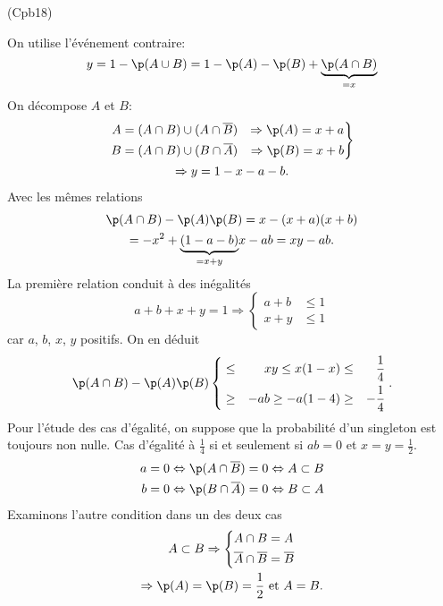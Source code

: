 \begin{tiny}(Cpb18)\end{tiny} On utilise l'événement contraire:
\[
  y = 1 - \p(A \cup B)
  = 1 -\p(A) - \p(B) + \underset{=x}{\underbrace{\p(A\cap B)}}
\]
On décompose $A$ et $B$:
\begin{multline*}
\left.
  \begin{aligned}
    A &= (A\cap B) \cup (A \cap \overline{B}) &\Rightarrow \p(A) = x + a\\
    B &= (A\cap B) \cup (B \cap \overline{A}) &\Rightarrow \p(B) = x + b
  \end{aligned}
\right\rbrace \\ \Rightarrow
y = 1 - x -a -b.
\end{multline*}
Avec les mêmes relations
\begin{multline*}
  \p(A \cap B) -\p(A) \p(B)
  = x -(x+a)(x+b) \\
  = -x^2 + \underset{=x+y}{\underbrace{(1-a-b)}} x -ab
  = xy - ab.
\end{multline*}
La première relation conduit à des inégalités
\[
  a + b + x + y = 1
  \Rightarrow
  \left\lbrace
  \begin{aligned}
    a + b &\leq 1 \\ x + y &\leq 1
  \end{aligned}
  \right.
\]
car $a$, $b$, $x$, $y$ positifs. On en déduit
\[
\p(A \cap B) -\p(A) \p(B)
\left\lbrace
\begin{aligned}
   &\leq& xy  \leq x(1-x)  &\leq& \frac{1}{4} \\
   &\geq& -ab \geq -a(1-4) &\geq& -\frac{1}{4}
\end{aligned}
\right. .
\]
Pour l'étude des cas d'égalité, on suppose que la probabilité d'un singleton est toujours non nulle.\newline
Cas d'égalité à $\frac{1}{4}$ si et seulement si $ab =0$ et $x = y = \frac{1}{2}$.
\[
\begin{aligned}
  a= 0 &\Leftrightarrow \p(A \cap \overline{B}) = 0 \Leftrightarrow A \subset B\\
  b= 0 &\Leftrightarrow \p(B \cap \overline{A}) = 0 \Leftrightarrow B \subset A
\end{aligned}
\]
Examinons l'autre condition dans un des deux cas
\begin{multline*}
  A \subset B \Rightarrow
  \left\lbrace
  \begin{aligned}
    A\cap B &= A \\ \overline{A} \cap \overline{B} &= \overline{B}
  \end{aligned}
\right. \\
\Rightarrow \p(A) = \p(B) = \frac{1}{2} \text{ et } A = B.
\end{multline*}
